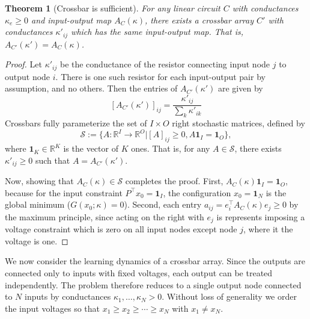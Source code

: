 \documentclass[final, 11pt, nonatbib]{elsarticle}
\theoremstyle{definition}
\theoremstyle{plain}
\newtheorem{theorem}[definition]{Theorem}
\newcommand{\AGK}{\color{blue}}
\numberwithin{equation}{section}
\begin{document}
\begin{theorem}
[Crossbar is sufficient]
    \label{Thm:Crossbar_sufficient}
    For any linear circuit $C$ with conductances $\kappa_e\geq0$ and input-output map $A_C(\kappa)$, there exists a crossbar array $C'$ with conductances $\kappa'_{ij}$ which has the same input-output map. That is, $A_{C'}(\kappa') = A_C(\kappa)$.
    \label{Thm:Crossbar}
\end{theorem}

\begin{proof}
    Let $\kappa'_{ij}$ be the conductance of the resistor connecting input node $j$ to output node $i$. There is one such resistor for each input-output pair by assumption, and no others. Then the entries of $A_{C'}(\kappa')$ are given by
    \[
    [A_{C'}(\kappa')]_{ij} =  \frac{\kappa'_{ij}} {\sum_k \kappa'_{ik}}
    \]
  Crossbars fully parameterize the set of $I \times O$ right stochastic matrices, defined by
    \[
    \mathcal{S} := \{A:\mathbb{R}^I\to \mathbb{R}^O|[A]_{ij} \geq 0, A\mathbf{1}_I = \mathbf{1}_O\},
    \]
    where $\mathbf{1}_K\in \mathbb{R}^{K}$ is the vector of $K$ ones. That is, for any $A \in \mathcal{S}$, there exists $\kappa'_{ij}\geq0$ such that $A = A_{C'}(\kappa')$. 

     Now, showing that $A_C(\kappa) \in \mathcal{S}$ completes the proof. First, $A_C(\kappa)\mathbf{1}_I =\mathbf{1}_O$, because for the input constraint $P^\top x_0 = \mathbf{1}_I$, the configuration $x_0 = \mathbf{1}_N$ is the global minimum ($G(x_0;\kappa) = 0$). Second, each entry $a_{ij} = e_i^\top A_C(\kappa) e_j \geq 0$ by the maximum principle, since acting on the right with $e_j$ is represents imposing a voltage constraint which is zero on all input nodes except node $j$, where it the 
    voltage is one.
    
\end{proof}


We now consider the learning dynamics of a crossbar array. Since the outputs are connected only to inputs with fixed voltages, each output can be treated independently. The problem therefore reduces to a single output node connected to $N$ inputs by conductances $\kappa_1, \ldots, \kappa_N > 0$.  Without loss of generality we order the input voltages so that $x_1 \geq x_2 \geq \cdots \geq x_N$ with $x_1 \neq x_N$.
 
\end{document}
